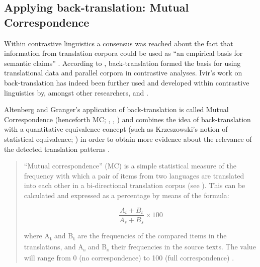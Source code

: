 \subsection{Applying back-translation: Mutual Correspondence}
\label{sec:2.3.3}  
Within contrastive linguistics a consensus was reached about the fact that information from translation corpora could be used as “an empirical basis for semantic claims” \citep[758]{noel_translations_2003}. According to \citet[24--28]{ebeling_patterns_2013}, back-translation formed the basis for using translational data and parallel corpora in contrastive analyses. Ivir’s work on back-translation has indeed been further used and developed within contrastive linguistics by, amongst other researchers, \citet{hasselgard_adverbial_1999} and \citet{altenberg_recent_2002}.

Altenberg and Granger’s application of back-translation is called Mutual Correspondence (henceforth MC; \citealp[254 ff.]{hasselgard_adverbial_1999}, \citealp[9]{altenberg_correspondence_2007}, \citealp[7--18]{altenberg_recent_2002}) and combines the idea of back-translation with a quantitative equivalence concept (such as Krzeszowski’s notion of statistical equivalence; \citealp[27--28]{krzeszowski_contrasting_1990}) in order to obtain more evidence about the relevance of the detected translation patterns \citep[17]{altenberg_recent_2002}.

\begin{quote}
``Mutual correspondence'' (MC) is a simple statistical measure of the frequency with which a pair of items from two languages are translated into each other in a bi-directional translation corpus (see \citealt{hasselgard_adverbial_1999}). This can be calculated and expressed as a percentage by means of the formula:
	
$$\frac{A_t + B_t}{A_s + B_s} \times 100$$

where A\textsubscript{t} and B\textsubscript{t} are the frequencies of the compared items in the translations, and A\textsubscript{s} and B\textsubscript{s} their frequencies in the source texts. The value will range from 0 (no correspondence) to 100 (full correspondence) \citep[9]{altenberg_correspondence_2007}.
\end{quote}

